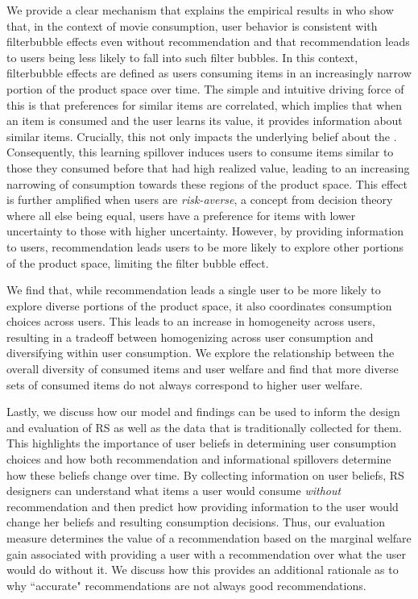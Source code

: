 \documentclass{article}
\newcommand{\xhdr}[1]{\vspace{1mm} \noindent{\bf #1}}
\begin{document}
\xhdr{Our Contributions\dgedit{.}}
We provide a clear mechanism that explains the empirical results in \cite{nguyen2014exploring} who show that, in the context of movie consumption, user behavior is consistent with filter\dgedit{-}bubble effects even without recommendation and that recommendation leads to users being less likely to fall into such filter bubbles. In this context, filter\dgedit{-}bubble effects are defined as users consuming items in an increasingly narrow portion of the product space over time. The simple and intuitive driving force of this is that preferences for similar items are correlated, which implies that when an item is consumed and the user learns its value, it provides information about similar items. Crucially, this not only impacts the underlying belief about the . Consequently, this learning spillover induces users to consume items similar to those they consumed before that had high realized value, leading to an increasing narrowing of consumption towards these regions of the product space. This effect is further amplified when users are \textit{risk-averse}, a concept from decision theory where all else being equal, users have a preference for items with lower uncertainty to those with higher uncertainty. However, by providing information to users, recommendation leads users to be more likely to explore other portions of the product space, limiting the filter bubble effect.
\par
We find that, while recommendation leads a single user to be more likely to explore diverse portions of the product space, it also coordinates consumption choices across users. This leads to an increase in homogeneity across users, resulting in a tradeoff between homogenizing across user consumption and diversifying within user consumption. We explore the relationship between the overall diversity of consumed items and user welfare and find that more diverse sets of consumed items do not always correspond to higher user welfare. 
\par
Lastly, we discuss how our model and findings can be used to inform the design and evaluation of RS as well as the data that is traditionally collected for them. This highlights the importance of user beliefs in determining user consumption choices and how both recommendation and informational spillovers determine how these beliefs change over time. By collecting information on user beliefs, RS designers can understand what items a user would consume \textit{without} recommendation and then predict how providing information to the user would change her beliefs and resulting consumption decisions. Thus,  our evaluation measure determines the value of a recommendation based on the marginal welfare gain associated with providing a user with a recommendation over what the user would do without it. We discuss how this provides an additional rationale as to why ``accurate" recommendations are not always good recommendations.
\end{document}
